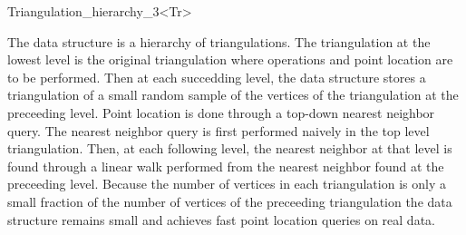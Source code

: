 \begin{ccRefClass}{Triangulation_hierarchy_3<Tr>}


\ccImplementation
The data structure is a hierarchy 
of triangulations. The triangulation at the lowest level is
the original triangulation where operations and point location are to 
be performed.
Then at each succedding level, the data structure
stores a triangulation of a small random sample of the vertices
of the triangulation at the preceeding level. Point location
is done through a top-down nearest neighbor query.
The nearest neighbor query is first
performed naively in the top level triangulation.
Then, at each following level, the nearest neighbor at that level
is found through a linear walk performed from
the nearest neighbor found at the preceeding level.
Because the number of vertices in each triangulation is only a small
fraction of the number of vertices of the preceeding triangulation 
the data structure remains small and achieves fast point location 
queries on real
data. 

\ccSeeAlso
{}\\

\end{ccRefClass}

